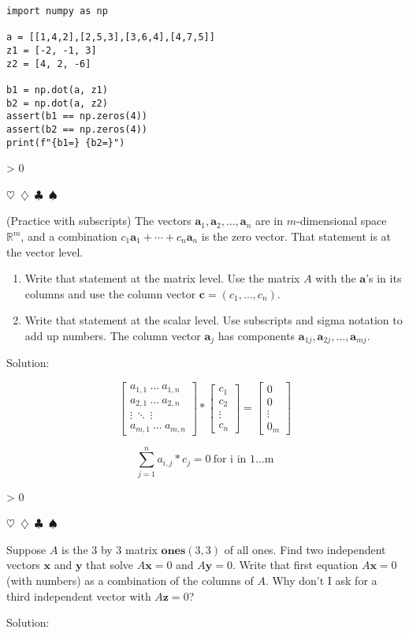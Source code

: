 \documentclass{article}
\newcommand{\sep}{\begin{center}$\heartsuit$~$\diamondsuit$~$\clubsuit$~$\spadesuit$\end{center}}
\newcommand{\sol}{\begin{center}\small{Solution:}\end{center}}
\newcommand{\vect}[1]{\ensuremath{\boldsymbol{#1}}}
\newcounter{prblm}
\newcommand{\problem}[1]{
  \begingroup
  \ifnum\value{prblm} > 0 \sep \fi
  \stepcounter{prblm}
  \noindent\textbf{\arabic{prblm}} #1
  \sol
  \endgroup
}
\begin{document}
\begin{verbatim}
import numpy as np

a = [[1,4,2],[2,5,3],[3,6,4],[4,7,5]]
z1 = [-2, -1, 3]
z2 = [4, 2, -6]

b1 = np.dot(a, z1)
b2 = np.dot(a, z2)
assert(b1 == np.zeros(4))
assert(b2 == np.zeros(4))
print(f"{b1=} {b2=}")
\end{verbatim}


\problem{(Practice with subscripts) The vectors $\vect{a}_1, \vect{a}_2, \ldots , \vect{a}_n$ are in $m$-dimensional space $\mathbb{R}^m$, and a combination $c_1\vect{a}_1 + \cdots + c_n\vect{a}_n$ is the zero vector. That statement is at the vector level. 
\begin{enumerate}[label=(\arabic*)]
\item Write that statement at the matrix level. Use the matrix $A$ with the $\vect{a}$'s in its columns and use the column vector $\vect{c} = (c_1, \ldots, c_n)$.
\item Write that statement at the scalar level. Use subscripts and sigma notation to add up numbers. The column vector $\vect{a}_j$ has components $\vect{a}_{1j}, \vect{a}_{2j}, \ldots, \vect{a}_{mj}$.
\end{enumerate}}


\begin{displaymath}
  \begin{bmatrix}
    a_{1,1} ~ \ldots ~ a_{1,n} \\
    a_{2,1} ~ \ldots ~ a_{2,n} \\
    \vdots ~ \ddots ~ \vdots \\
    a_{m,1} ~ \ldots ~ a_{m,n}
  \end{bmatrix}
  * \begin{bmatrix} c_1 \\ c_2 \\ \vdots \\ c_n \end{bmatrix}
  = \begin{bmatrix} 0 \\ 0 \\ \vdots \\ 0_m \end{bmatrix}
\end{displaymath}

\begin{displaymath}
  \sum_{j=1}^{n} a_{i,j} * c_j = 0 ~ \text{for i in 1\ldots m}
\end{displaymath}


\problem{Suppose $A$ is the 3 by 3 matrix $\mathbf{ones}(3, 3)$ of all ones. Find two independent vectors $\vect{x}$ and $\vect{y}$ that solve $A\vect{x} = 0$ and $A\vect{y} = 0$. Write that first equation $A\vect{x} = 0$ (with numbers) as a combination of the columns of $A$. Why don't I ask for a third independent vector with $A\vect{z} = 0$?}
\end{document}
